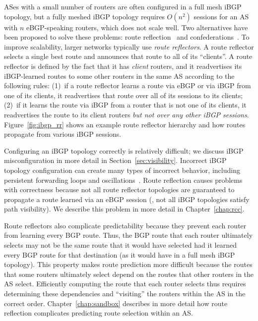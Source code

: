 ASes with a small number of routers are often configured in a full mesh
iBGP topology, but a fully meshed iBGP topology requires $O(n^2)$
sessions for an AS with $n$ eBGP-speaking routers, which does not scale
well.  Two alternatives have been proposed to solve these problems:
route reflection~\cite{rfc2796} and confederations~\cite{rfc3065}.  To
improve scalability, larger networks typically use {\em route
reflectors}.  A route reflector selects a single best route and
announces that route to all of its ``clients''.  A route reflector is
defined by the fact that it has {\em client} routers, and it
readvertises its iBGP-learned routes to some other routers in the same
AS according to the following rules: (1)~if a route reflector learns a
route via eBGP or via iBGP from one of its clients, it readvertises that
route over all of its sessions to its clients; (2)~if it learns the
route via iBGP from a router that is not one of its clients, it
readvertises the route to its client routers {\em but not over any other
iBGP sessions}.  Figure~\ref{fig:ibgp_rr} shows an example route
reflector hierarchy and how routes propagate from various iBGP sessions.

Configuring an iBGP topology correctly is relatively difficult; we
discuss iBGP misconfiguration in more detail in
Section~\ref{sec:visibility}.  Incorrect iBGP topology configuration can
create many types of incorrect behavior, including persistent forwarding
loops and oscillations~\cite{Griffin2002}.
Route reflection causes problems with correctness because not all route
reflector topologies are guaranteed to propagate a route learned via an
eBGP session (\ie, not all iBGP topologies satisfy path visibility).  We
describe this problem in more detail in Chapter~\ref{chap:rcc}.  

Route reflectors also complicate predictability because they prevent each
router from learning every BGP route.  Thus, the BGP route that each
router ultimately selects may not be the same route that it would have
selected had it learned every BGP route for that destination (as it
would have in a full mesh iBGP topology).  This property makes route
prediction 
more difficult because the routes that some routers ultimately select
depend on the routes that other routers in the AS select.  Efficiently
computing the route that each router selects thus requires determining
these dependencies and ``visiting'' the routers within the AS in the
correct order.  Chapter~\ref{chap:sandbox} describes in more detail how
route reflection complicates predicting route selection within an AS.

